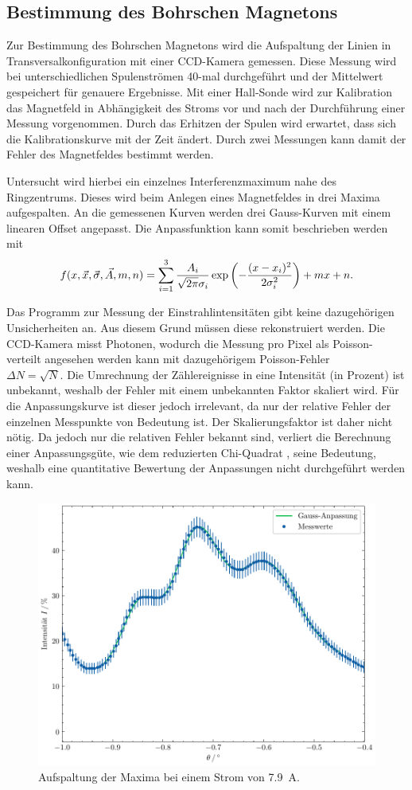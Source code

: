 \subsection{Bestimmung des Bohrschen Magnetons}\label{sec:magneton}
Zur Bestimmung des Bohrschen Magnetons wird die Aufspaltung der Linien 
in Transversalkonfiguration mit einer CCD-Kamera gemessen. Diese Messung wird 
bei unterschiedlichen Spulenströmen 40-mal durchgeführt und der Mittelwert 
gespeichert für genauere Ergebnisse. Mit einer Hall-Sonde wird 
zur Kalibration das Magnetfeld in Abhängigkeit des Stroms vor und nach der Durchführung
einer Messung vorgenommen. Durch das Erhitzen der Spulen wird erwartet, dass sich 
die Kalibrationskurve mit der Zeit ändert. Durch zwei Messungen kann damit der Fehler des 
Magnetfeldes bestimmt werden.

Untersucht wird hierbei ein einzelnes Interferenzmaximum nahe des Ringzentrums. Dieses wird 
beim Anlegen eines Magnetfeldes in drei Maxima aufgespalten. An die gemessenen Kurven 
werden drei Gauss-Kurven mit einem linearen Offset angepasst. Die Anpassfunktion kann somit beschrieben werden 
mit 
\begin{equation*}
    f(x, \vec x, \vec \sigma, \vec A, m, n) = \sum_{i=1}^3 \frac{A_i}{\sqrt{2\pi}\sigma_i}
        \exp\qty(-\frac{(x-x_i)^2}{2\sigma_i^2}) +mx + n.
\end{equation*}

Das Programm zur Messung der Einstrahlintensitäten gibt keine dazugehörigen Unsicherheiten an.
Aus diesem Grund müssen diese rekonstruiert werden. Die CCD-Kamera misst Photonen, wodurch 
die Messung pro Pixel als Poisson-verteilt angesehen werden kann mit dazugehörigem Poisson-Fehler \\
$\Delta N = \sqrt{N}$. Die Umrechnung der Zählereignisse in eine Intensität (in Prozent) ist unbekannt, 
weshalb der Fehler mit einem unbekannten Faktor skaliert wird. Für die Anpassungskurve 
ist dieser jedoch irrelevant, da nur der relative Fehler der einzelnen Messpunkte von Bedeutung ist. 
Der Skalierungsfaktor ist daher nicht nötig. Da jedoch nur die relativen Fehler bekannt sind, verliert 
die Berechnung einer Anpassungsgüte, wie dem reduzierten Chi-Quadrat \cite{wiki:reduced_chi_square},
seine Bedeutung, weshalb eine quantitative Bewertung der Anpassungen nicht durchgeführt werden kann.

\begin{figure}
    \centering
    \includegraphics[width=.6\linewidth]{../figs/gauss_i7.9.pdf}
    \caption{Aufspaltung der Maxima bei einem Strom von \SI{7.9}{\ampere}.}
    \label{fig:gauss_i79}
\end{figure}

